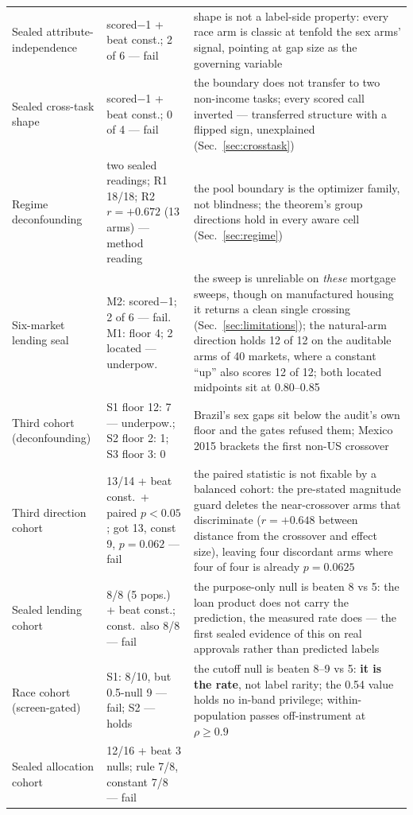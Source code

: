 \documentclass[conference]{IEEEtran}
\begin{document}
\begin{table}[t]
\begin{tabular}{@{}p{2.35cm}p{1.55cm}p{3.6cm}@{}}
Sealed attribute-independence & scored$-$1 + beat const.; 2 of 6 --- fail & shape is not a
label-side property: every race arm is classic at tenfold the sex arms' signal, pointing
at gap size as the governing variable \\
Sealed cross-task shape & scored$-$1 + beat const.; 0 of 4 --- fail & the boundary does
not transfer to two non-income tasks; every scored call inverted --- transferred
structure with a flipped sign, unexplained (Sec.~\ref{sec:crosstask}) \\
Regime deconfounding & two sealed readings; R1 18/18; R2 $r=+0.672$ (13 arms) --- method reading &
the pool boundary is the optimizer family, not blindness; the theorem's group
directions hold in every aware cell (Sec.~\ref{sec:regime}) \\
Six-market lending seal & M2: scored$-$1; 2 of 6 --- fail. M1: floor 4; 2 located ---
underpow. & the sweep is unreliable on \emph{these} mortgage sweeps, though on manufactured housing it returns a clean single crossing (Sec.~\ref{sec:limitations}); the natural-arm direction holds 12 of 12 on the auditable arms of 40 markets, where a
constant ``up'' also scores 12 of 12; both
located midpoints sit at 0.80--0.85 \\
Third cohort (deconfounding) & S1 floor 12: 7 --- underpow.; S2 floor 2: 1; S3 floor
3: 0 & Brazil's sex gaps sit below the audit's own floor and the gates refused them;
Mexico 2015 brackets the first non-US crossover \\
Third direction cohort & 13/14 + beat const.\ + paired $p<0.05$; got 13, const 9,
$p=0.062$ --- fail & the paired statistic is not fixable by a balanced cohort: the
pre-stated magnitude guard deletes the near-crossover arms that discriminate
($r = +0.648$ between distance from the crossover and effect size), leaving four
discordant arms where four of four is already $p = 0.0625$ \\
Sealed lending cohort & 8/8 (5 pops.) + beat const.; const.\ also 8/8 --- fail &
the purpose-only null is beaten 8 vs 5: the loan product does not carry the prediction, the
measured rate does --- the first sealed evidence of this on real approvals rather than
predicted labels \\
Race cohort (screen-gated) & S1: 8/10, but 0.5-null 9 --- fail; S2 --- holds & the
cutoff null is beaten 8--9 vs 5: \textbf{it is the rate}, not label rarity; the 0.54
value holds no in-band privilege; within-population passes off-instrument at
$\rho \ge 0.9$ \\
Sealed allocation cohort & 12/16 + beat 3 nulls; rule 7/8, constant 7/8 --- fail &

\end{tabular}
\end{table}
\end{document}
